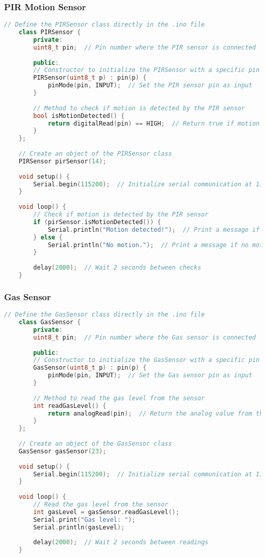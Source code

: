 \subsubsection*{PIR Motion Sensor}
\begin{lstlisting}[language=C++]
	// Define the PIRSensor class directly in the .ino file
	class PIRSensor {
		private:
		uint8_t pin;  // Pin number where the PIR sensor is connected
		
		public:
		// Constructor to initialize the PIRSensor with a specific pin
		PIRSensor(uint8_t p) : pin(p) {
			pinMode(pin, INPUT);  // Set the PIR sensor pin as input
		}
		
		// Method to check if motion is detected by the PIR sensor
		bool isMotionDetected() {
			return digitalRead(pin) == HIGH;  // Return true if motion is detected
		}
	};
	
	// Create an object of the PIRSensor class
	PIRSensor pirSensor(14);
	
	void setup() {
		Serial.begin(115200);  // Initialize serial communication at 115200 baud rate
	}
	
	void loop() {
		// Check if motion is detected by the PIR sensor
		if (pirSensor.isMotionDetected()) {
			Serial.println("Motion detected!");  // Print a message if motion is detected
		} else {
			Serial.println("No motion.");  // Print a message if no motion is detected
		}
		
		delay(2000);  // Wait 2 seconds between checks
	}
\end{lstlisting}
\clearpage
\subsubsection*{Gas Sensor}
\begin{lstlisting}[language=C++]
	// Define the GasSensor class directly in the .ino file
	class GasSensor {
		private:
		uint8_t pin;  // Pin number where the Gas sensor is connected
		
		public:
		// Constructor to initialize the GasSensor with a specific pin
		GasSensor(uint8_t p) : pin(p) {
			pinMode(pin, INPUT);  // Set the Gas sensor pin as input
		}
		
		// Method to read the gas level from the sensor
		int readGasLevel() {
			return analogRead(pin);  // Return the analog value from the sensor
		}
	};
	
	// Create an object of the GasSensor class
	GasSensor gasSensor(23);
	
	void setup() {
		Serial.begin(115200);  // Initialize serial communication at 115200 baud rate
	}
	
	void loop() {
		// Read the gas level from the sensor
		int gasLevel = gasSensor.readGasLevel();
		Serial.print("Gas level: ");
		Serial.println(gasLevel);
		
		delay(2000);  // Wait 2 seconds between readings
	}
\end{lstlisting}
\clearpage	
